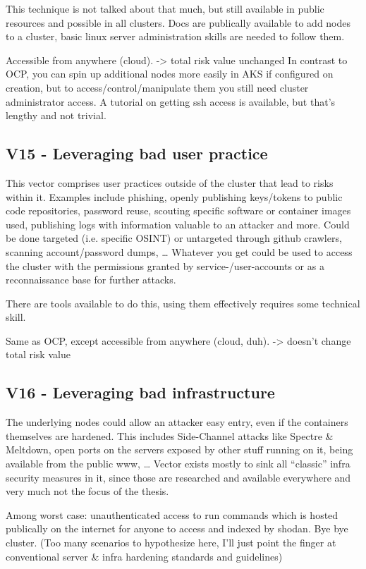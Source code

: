 This technique is not talked about that much, but still available in public resources and possible in all clusters. Docs are publically available to add nodes to a cluster, basic linux server administration skills are needed to follow them.

Accessible from anywhere (cloud).
-> total risk value unchanged
In contrast to OCP, you can spin up additional nodes more easily in AKS if configured on creation, but to access/control/manipulate them you still need cluster administrator access.
A tutorial on getting ssh access is available, but that’s lengthy and not trivial.

\subsection{V15 - Leveraging bad user practice}
This vector comprises user practices outside of the cluster that lead to risks within it. Examples include phishing, openly publishing keys/tokens to public code repositories, password reuse, scouting specific software or container images used, publishing logs with information valuable to an attacker and more.
Could be done targeted (i.e. specific OSINT) or untargeted through github crawlers, scanning account/password dumps, …
Whatever you get could be used to access the cluster with the permissions granted by service-/user-accounts or as a reconnaissance base for further attacks.

There are tools available to do this, using them effectively requires some technical skill.

Same as OCP, except accessible from anywhere (cloud, duh).
-> doesn’t change total risk value

\subsection{V16 - Leveraging bad infrastructure}
The underlying nodes could allow an attacker easy entry, even if the containers themselves are hardened. This includes Side-Channel attacks like Spectre \& Meltdown, open ports on the servers exposed by other stuff running on it, being available from the public www, …
Vector exists mostly to sink all “classic” infra security measures in it, since those are researched and available everywhere and very much not the focus of the thesis.

Among worst case: unauthenticated access to run commands which is hosted publically on the internet for anyone to access and indexed by shodan. Bye bye cluster.
(Too many scenarios to hypothesize here, I’ll just point the finger at conventional server \& infra hardening standards and guidelines)

